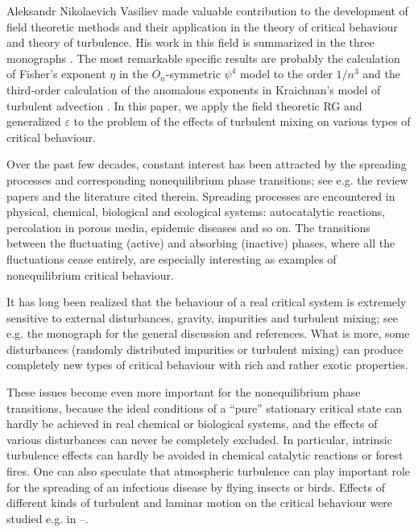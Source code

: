 \documentclass[12pt]{iopart}
\begin{document}
Aleksandr Nikolaevich Vasiliev made valuable contribution to the development
of field theoretic methods and their application in the theory of critical
behaviour and theory of turbulence. His work in this field is summarized in
the three monographs \cite{Book3,funk,turbo}. The most remarkable specific
results are probably the calculation of Fisher's exponent $\eta$ in the
$O_{n}$-symmetric $\psi^{4}$ model to the order $1/n^{3}$ \cite{n3} and the
third-order calculation of the anomalous exponents in Kraichnan's model of
turbulent advection \cite{Kr3}. In this paper, we apply the field theoretic
RG and generalized $\varepsilon$ to the problem of the effects of turbulent
mixing on various types of critical behaviour.

\bigskip

Over the past few decades, constant interest has been attracted by the
spreading processes and corresponding nonequilibrium phase transitions;
see e.g. the review papers \cite{Hinr} and the literature cited therein.
Spreading processes are encountered in physical, chemical, biological and
ecological systems: autocatalytic reactions, percolation in porous media,
epidemic diseases and so on.
The transitions between the fluctuating (active) and absorbing (inactive)
phases, where all the fluctuations cease entirely, are
especially interesting as examples of nonequilibrium critical behaviour.

It has long been realized that the behaviour of a real critical system
is extremely sensitive to external disturbances, gravity, impurities and
turbulent mixing; see e.g. the monograph \cite{Ivanov} for the general
discussion and references.
What is more, some disturbances (randomly distributed impurities or
turbulent mixing) can produce completely new types of critical
behaviour with rich and rather exotic properties.

These issues become even more important for the nonequilibrium phase
transitions, because the ideal conditions of a ``pure'' stationary critical
state can hardly be achieved in real chemical or biological systems, and
the effects of various disturbances can never be completely excluded.
In particular, intrinsic turbulence effects can hardly be avoided in
chemical catalytic reactions or forest fires. One can also speculate that
atmospheric turbulence can play important role for the spreading of an
infectious disease by flying insects or birds. Effects of different kinds
of turbulent and laminar motion on the critical behaviour were studied
e.g. in \cite{Onuki}--\cite{AIK}.
\end{document}
